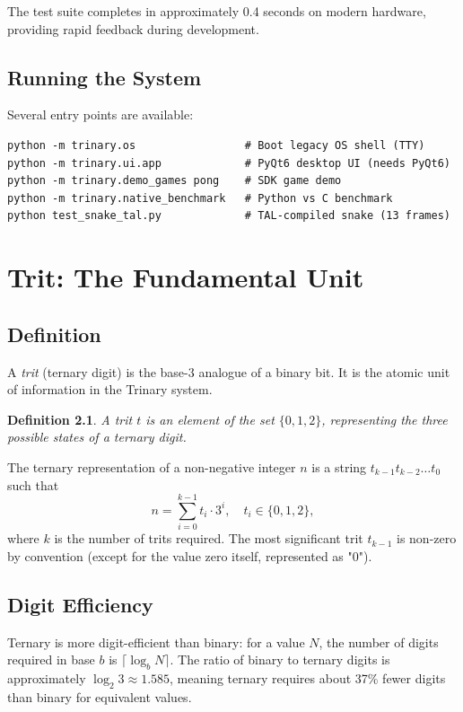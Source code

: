 \documentclass[12pt,a4paper,twoside]{book}
\theoremstyle{trinarytheorem}
\theoremstyle{trinarydefinition}
\newtheorem{definition}{Definition}[chapter]
\newcommand{\code}[1]{\textsf{#1}}
\begin{document}
The test suite completes in approximately 0.4 seconds on modern hardware, providing
rapid feedback during development.

\section{Running the System}

Several entry points are available:

\begin{verbatim}
python -m trinary.os                 # Boot legacy OS shell (TTY)
python -m trinary.ui.app             # PyQt6 desktop UI (needs PyQt6)
python -m trinary.demo_games pong    # SDK game demo
python -m trinary.native_benchmark   # Python vs C benchmark
python test_snake_tal.py             # TAL-compiled snake (13 frames)
\end{verbatim}

\chapter{Trit: The Fundamental Unit}
\label{ch:trit}

\section{Definition}

A \emph{trit} (ternary digit) is the base-3 analogue of a binary bit. It is the atomic
unit of information in the Trinary system.

\begin{definition}
A trit $t$ is an element of the set $\{0,1,2\}$, representing the three possible states
of a ternary digit.
\end{definition}

The ternary representation of a non-negative integer $n$ is a string
$t_{k-1}t_{k-2}\ldots t_0$ such that
\[
n = \sum_{i=0}^{k-1} t_i \cdot 3^i,\quad t_i \in \{0,1,2\},
\]
where $k$ is the number of trits required. The most significant trit $t_{k-1}$ is
non-zero by convention (except for the value zero itself, represented as \code{"0"}).

\section{Digit Efficiency}

Ternary is more digit-efficient than binary: for a value $N$, the number of digits
required in base $b$ is $\lceil \log_b N \rceil$. The ratio of binary to ternary digits
is approximately $\log_2 3 \approx 1.585$, meaning ternary requires about 37\% fewer
digits than binary for equivalent values.
\end{document}
